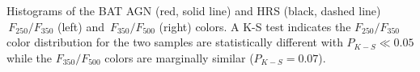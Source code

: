 \label{fig:hist_250_350_color} Histograms of the BAT AGN (red, solid line) and HRS (black, dashed line) $\,F_{250}/F_{350}$ (left) and  $\,F_{350}/F_{500}$ (right) colors. A K-S test indicates the $F_{250}/F_{350}$ color distribution for the two samples are statistically different with $P_{K-S} \ll 0.05$ while the $F_{350}/F_{500}$ colors are marginally similar ($P_{K-S} = 0.07$).